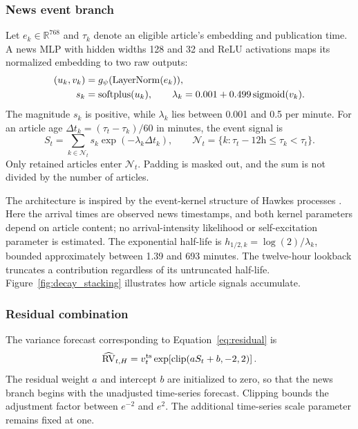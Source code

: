 \subsubsection{News event branch}
Let $e_k\in\mathbb R^{768}$ and $\tau_k$ denote an eligible article's
embedding and publication time. A news MLP with hidden widths 128 and 32
and ReLU activations maps its normalized embedding to two raw outputs:
\begin{align}
 (u_k,v_k)&=g_\psi(\operatorname{LayerNorm}(e_k)),\\
 s_k&=\operatorname{softplus}(u_k),\qquad
 \lambda_k=0.001+0.499\operatorname{sigmoid}(v_k).\label{eq:impact_head}
\end{align}
The magnitude $s_k$ is positive, while $\lambda_k$ lies between 0.001
and 0.5 per minute. For an article age
$\Delta t_k=(\tau_t-\tau_k)/60$ in minutes, the event signal is
\begin{equation}
 S_t=\sum_{k\in\mathcal N_t}s_k\exp(-\lambda_k\Delta t_k),
 \qquad\mathcal N_t=\{k:\tau_t-12\mathrm{h}\leq\tau_k<\tau_t\}.
 \label{eq:decay}
\end{equation}
Only retained articles enter $\mathcal N_t$. Padding is masked out, and
the sum is not divided by the number of articles.

The architecture is inspired by the event-kernel structure of Hawkes
processes \citep{HAWKES1971}. Here the arrival times are observed news
timestamps, and both kernel parameters depend on article content; no
arrival-intensity likelihood or self-excitation parameter is estimated.
The exponential half-life is $h_{1/2,k}=\log(2)/\lambda_k$, bounded
approximately between 1.39 and 693 minutes. The twelve-hour lookback
truncates a contribution regardless of its untruncated half-life.
Figure~\ref{fig:decay_stacking} illustrates how article signals accumulate.

\subsubsection{Residual combination}
The variance forecast corresponding to Equation~\eqref{eq:residual} is
\begin{equation}
 \widehat{\operatorname{RV}}_{t,H}=v_t^{\mathrm{ts}}
      \exp\!\left[\operatorname{clip}(aS_t+b,-2,2)\right].
\end{equation}
The residual weight $a$ and intercept $b$ are initialized to zero,
so that the news branch begins with the unadjusted time-series forecast.
Clipping bounds the adjustment factor between $e^{-2}$ and $e^2$.
The additional time-series scale parameter remains fixed at one.

